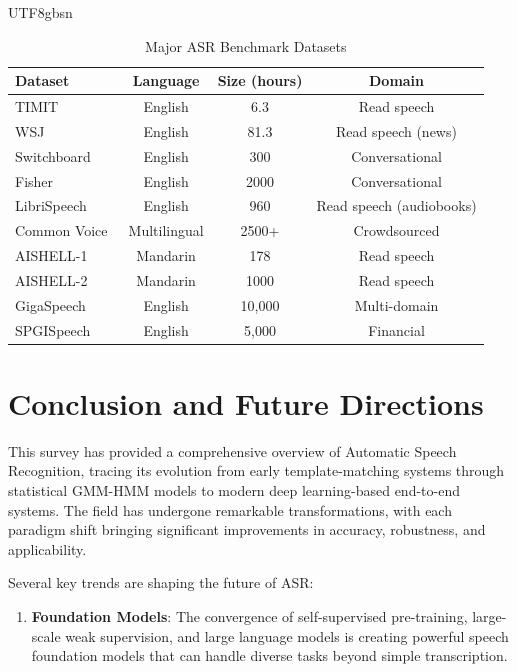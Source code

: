 \documentclass[12pt,a4paper]{article}
\begin{document}
\begin{CJK}{UTF8}{gbsn}
\begin{table}[htbp]
\centering
\caption{Major ASR Benchmark Datasets}
\label{tab:benchmarks}
\begin{tabular}{@{}lccc@{}}
\toprule
\textbf{Dataset} & \textbf{Language} & \textbf{Size (hours)} & \textbf{Domain} \\
\midrule
TIMIT~\cite{garofolo1993timit} & English & 6.3 & Read speech \\
WSJ~\cite{paul1992design} & English & 81.3 & Read speech (news) \\
Switchboard~\cite{godfrey1992switchboard} & English & 300 & Conversational \\
Fisher~\cite{cieri2004fisher} & English & 2000 & Conversational \\
LibriSpeech~\cite{panayotov2015librispeech} & English & 960 & Read speech (audiobooks) \\
Common Voice~\cite{ardila2020common} & Multilingual & 2500+ & Crowdsourced \\
AISHELL-1~\cite{bu2017aishell} & Mandarin & 178 & Read speech \\
AISHELL-2~\cite{du2018aishell} & Mandarin & 1000 & Read speech \\
GigaSpeech~\cite{chen2021gigaspeech} & English & 10,000 & Multi-domain \\
SPGISpeech~\cite{o2021spgispeech} & English & 5,000 & Financial \\
\bottomrule
\end{tabular}
\end{table}

\section{Conclusion and Future Directions}
\label{sec:conclusion}

This survey has provided a comprehensive overview of Automatic Speech Recognition, tracing its evolution from early template-matching systems through statistical GMM-HMM models to modern deep learning-based end-to-end systems. The field has undergone remarkable transformations, with each paradigm shift bringing significant improvements in accuracy, robustness, and applicability.

Several key trends are shaping the future of ASR:

\begin{enumerate}[leftmargin=*]
    \item \textbf{Foundation Models}: The convergence of self-supervised pre-training, large-scale weak supervision, and large language models is creating powerful speech foundation models that can handle diverse tasks beyond simple transcription.


\end{enumerate}
\end{CJK}
\end{document}
